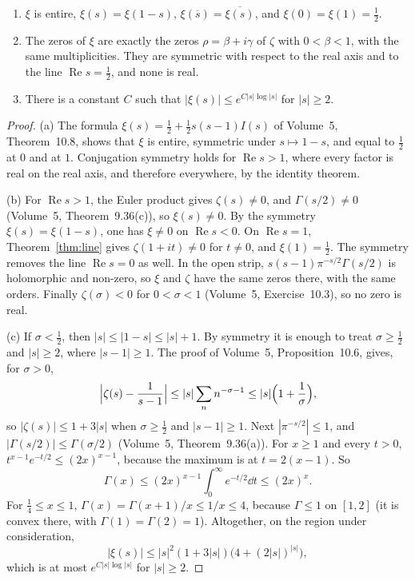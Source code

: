\begin{proposition}\label{prop:xi}
\begin{enumerate}[label=(\alph*)]
\item $\xi$ is entire, $\xi(s)=\xi(1-s)$, $\xi(\overline s)=\overline{\xi(s)}$, and $\xi(0)=\xi(1)=\frac12$.
\item The zeros of $\xi$ are exactly the zeros $\rho=\beta+i\gamma$ of $\zeta$ with $0<\beta<1$, with the same multiplicities. They are symmetric with respect to the real axis and to the line $\operatorname{Re}s=\frac12$, and none is real.
\item There is a constant $C$ such that $|\xi(s)|\le e^{C|s|\log|s|}$ for $|s|\ge2$.
\end{enumerate}
\end{proposition}
\begin{proof}
(a) The formula $\xi(s)=\frac12+\frac12 s(s-1)I(s)$ of Volume~5, Theorem~10.8, shows that $\xi$ is entire, symmetric under $s\mapsto1-s$, and equal to $\frac12$ at $0$ and at $1$. Conjugation symmetry holds for $\operatorname{Re}s>1$, where every factor is real on the real axis, and therefore everywhere, by the identity theorem.

(b) For $\operatorname{Re}s>1$, the Euler product gives $\zeta(s)\ne0$, and $\Gamma(s/2)\ne0$ (Volume~5, Theorem~9.36(c)), so $\xi(s)\ne0$. By the symmetry $\xi(s)=\xi(1-s)$, one has $\xi\ne0$ on $\operatorname{Re}s<0$. On $\operatorname{Re}s=1$, Theorem~\ref{thm:line} gives $\zeta(1+it)\ne0$ for $t\ne0$, and $\xi(1)=\frac12$. The symmetry removes the line $\operatorname{Re}s=0$ as well. In the open strip, $s(s-1)\pi^{-s/2}\Gamma(s/2)$ is holomorphic and non-zero, so $\xi$ and $\zeta$ have the same zeros there, with the same orders. Finally $\zeta(\sigma)<0$ for $0<\sigma<1$ (Volume~5, Exercise~10.3), so no zero is real.

(c) If $\sigma<\frac12$, then $|s|\le|1-s|\le|s|+1$. By symmetry it is enough to treat $\sigma\ge\frac12$ and $|s|\ge2$, where $|s-1|\ge1$. The proof of Volume~5, Proposition~10.6, gives, for $\sigma>0$,
\[
\Bigl|\zeta(s)-\frac1{s-1}\Bigr|\le|s|\sum_n n^{-\sigma-1}\le|s|\Bigl(1+\frac1\sigma\Bigr),
\]
so $|\zeta(s)|\le1+3|s|$ when $\sigma\ge\frac12$ and $|s-1|\ge1$. Next $|\pi^{-s/2}|\le1$, and $|\Gamma(s/2)|\le\Gamma(\sigma/2)$ (Volume~5, Theorem~9.36(a)). For $x\ge1$ and every $t>0$, $t^{x-1}e^{-t/2}\le(2x)^{x-1}$, because the maximum is at $t=2(x-1)$. So
\[
\Gamma(x)\le(2x)^{x-1}\int_0^\infty e^{-t/2}\dd t\le(2x)^x.
\]
For $\frac14\le x\le1$, $\Gamma(x)=\Gamma(x+1)/x\le1/x\le4$, because $\Gamma\le1$ on $[1,2]$ (it is convex there, with $\Gamma(1)=\Gamma(2)=1$). Altogether, on the region under consideration,
\[
|\xi(s)|\le|s|^2(1+3|s|)\bigl(4+(2|s|)^{|s|}\bigr),
\]
which is at most $e^{C|s|\log|s|}$ for $|s|\ge2$.
\end{proof}

